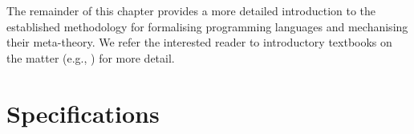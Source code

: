 {%
% 

The remainder of this chapter provides a more detailed introduction to the
established methodology for formalising programming languages and mechanising their
meta-theory. We refer the interested reader to introductory textbooks on the matter (e.g., \cite{tapl})
for more detail.



\section{Specifications}\label{sec:intro:specification}

}
